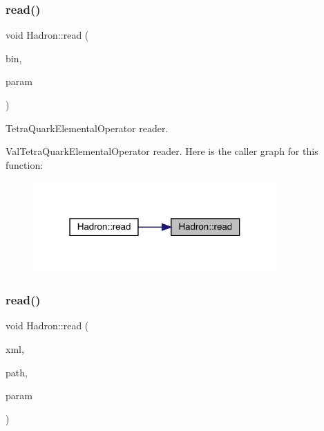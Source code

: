 \subsubsection{\texorpdfstring{read()}{read()}\hspace{0.1cm}{\footnotesize\ttfamily [58/94]}}
{\footnotesize\ttfamily void Hadron\+::read (\begin{DoxyParamCaption}\item[{\mbox{\hyperlink{classADATIO_1_1BinaryReader}{Binary\+Reader}} \&}]{bin,  }\item[{\mbox{\hyperlink{structHadron_1_1ValTetraQuarkElementalOperator__t}{Val\+Tetra\+Quark\+Elemental\+Operator\+\_\+t}} \&}]{param }\end{DoxyParamCaption})}



Tetra\+Quark\+Elemental\+Operator reader. 

Val\+Tetra\+Quark\+Elemental\+Operator reader. Here is the caller graph for this function\+:
\nopagebreak
\begin{figure}[H]
\begin{center}
\leavevmode
\includegraphics[width=265pt]{d1/daf/namespaceHadron_a614faa9c1c7ae1880f009d5c9aa672ec_icgraph}
\end{center}
\end{figure}
\mbox{\label{namespaceHadron_adc5eb75838fc176e1641d6264c9a894d}} 
\subsubsection{\texorpdfstring{read()}{read()}\hspace{0.1cm}{\footnotesize\ttfamily [59/94]}}
{\footnotesize\ttfamily void Hadron\+::read (\begin{DoxyParamCaption}\item[{\mbox{\hyperlink{classADATXML_1_1XMLReader}{X\+M\+L\+Reader}} \&}]{xml,  }\item[{const std\+::string \&}]{path,  }\item[{\mbox{\hyperlink{structHadron_1_1KeyHadronSUNNPartIrrepOp__t_1_1CGPair__t}{Key\+Hadron\+S\+U\+N\+N\+Part\+Irrep\+Op\+\_\+t\+::\+C\+G\+Pair\+\_\+t}} \&}]{param }\end{DoxyParamCaption})}

